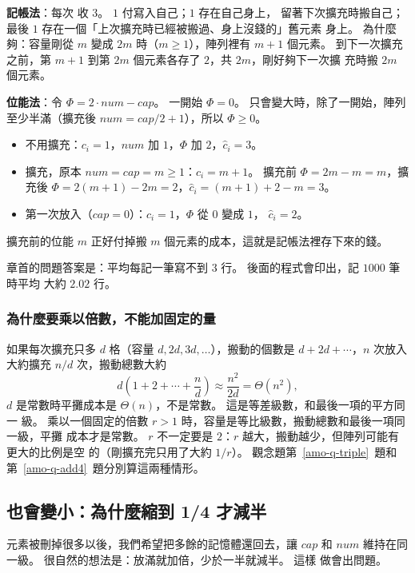 \textbf{記帳法}：每次  收 $3$。 $1$ 付寫入自己；$1$ 存在自己身上，
留著下次擴充時搬自己；最後 $1$ 存在一個「上次擴充時已經被搬過、身上沒錢的」舊元素
身上。 為什麼夠：容量剛從 $m$ 變成 $2m$ 時（$m \ge 1$），陣列裡有 $m + 1$ 個元素。
到下一次擴充之前，第 $m + 1$ 到第 $2m$ 個元素各存了 $2$，共 $2m$，剛好夠下一次擴
充時搬 $2m$ 個元素。

\textbf{位能法}：令 $\Phi = 2 \cdot \mathit{num} - \mathit{cap}$。 一開始
$\Phi = 0$。 只會變大時，除了一開始，陣列至少半滿（擴充後 $\mathit{num} =
\mathit{cap}/2 + 1$），所以 $\Phi \ge 0$。
\begin{itemize}
\item 不用擴充：$c_i = 1$，$\mathit{num}$ 加 $1$，$\Phi$ 加 $2$，$\hat{c}_i = 3$。
\item 擴充，原本 $\mathit{num} = \mathit{cap} = m \ge 1$：$c_i = m + 1$。 擴充前
$\Phi = 2m - m = m$，擴充後 $\Phi = 2(m + 1) - 2m = 2$，$\hat{c}_i = (m + 1) + 2 - m
= 3$。
\item 第一次放入（$\mathit{cap} = 0$）：$c_i = 1$，$\Phi$ 從 $0$ 變成 $1$，
$\hat{c}_i = 2$。
\end{itemize}
擴充前的位能 $m$ 正好付掉搬 $m$ 個元素的成本，這就是記帳法裡存下來的錢。

章首的問題答案是：平均每記一筆寫不到 $3$ 行。 後面的程式會印出，記 $1000$ 筆時平均
大約 $2.02$ 行。

\subsubsection{為什麼要乘以倍數，不能加固定的量}

如果每次擴充只多 $d$ 格（容量 $d, 2d, 3d, \ldots$），搬動的個數是
$d + 2d + \cdots$，$n$ 次放入大約擴充 $n/d$ 次，搬動總數大約
\[
d \left( 1 + 2 + \cdots + \frac{n}{d} \right) \approx \frac{n^2}{2d} = \Theta(n^2),
\]
$d$ 是常數時平攤成本是 $\Theta(n)$，不是常數。 這是等差級數，和最後一項的平方同一
級。 乘以一個固定的倍數 $r > 1$ 時，容量是等比級數，搬動總數和最後一項同一級，平攤
成本才是常數。 $r$ 不一定要是 $2$：$r$ 越大，搬動越少，但陣列可能有更大的比例是空
的（剛擴充完只用了大約 $1/r$）。 觀念題第~\ref{amo-q-triple}~題和第~\ref{amo-q-add4}~題分別算這兩種情形。

\subsection{也會變小：為什麼縮到 1/4 才減半}

元素被刪掉很多以後，我們希望把多餘的記憶體還回去，讓 $\mathit{cap}$ 和
$\mathit{num}$ 維持在同一級。 很自然的想法是：放滿就加倍，少於一半就減半。 這樣
做會出問題。

